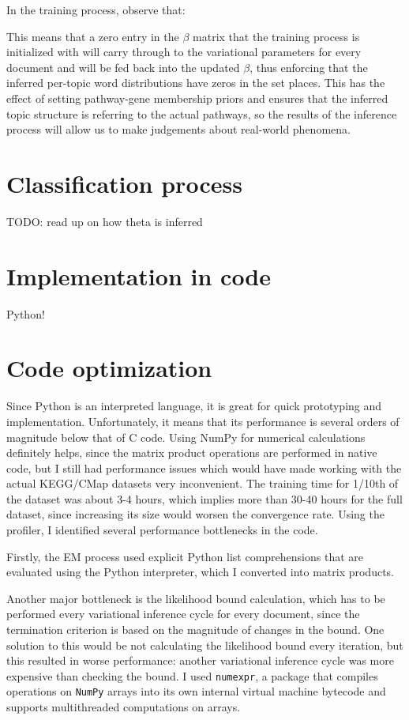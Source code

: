 \documentclass[12pt,a4paper,twoside,openright]{report}
\begin{document}
In the training process, observe that:

This means that a zero entry in the $\beta$ matrix that the training process is initialized with will carry through to the variational parameters for every document and will be fed back into the updated $\beta$, thus enforcing that the inferred per-topic word distributions have zeros in the set places. This has the effect of setting pathway-gene membership priors and ensures that the inferred topic structure is referring to the actual pathways, so the results of the inference process will allow us to make judgements about real-world phenomena.

\section{Classification process}

TODO: read up on how theta is inferred

\section{Implementation in code}

Python!

\section{Code optimization}

Since Python is an interpreted language, it is great for quick prototyping and implementation. Unfortunately, it means that its performance is several orders of magnitude below that of C code. Using NumPy for numerical calculations definitely helps, since the matrix product operations are performed in native code, but I still had performance issues which would have made working with the actual KEGG/CMap datasets very inconvenient. The training time for 1/10th of the dataset was about 3-4 hours, which implies more than 30-40 hours for the full dataset, since increasing its size would worsen the convergence rate. Using the profiler, I identified several performance bottlenecks in the code.

Firstly, the EM process used explicit Python list comprehensions that are evaluated using the Python interpreter, which I converted into matrix products.

Another major bottleneck is the likelihood bound calculation, which has to be performed every variational inference cycle for every document, since the termination criterion is based on the magnitude of changes in the bound. One solution to this would be not calculating the likelihood bound every iteration, but this resulted in worse performance: another variational inference cycle was more expensive than checking the bound. I used \texttt{numexpr}, a package that compiles operations on \texttt{NumPy} arrays into its own internal virtual machine bytecode and supports multithreaded computations on arrays.
\end{document}
